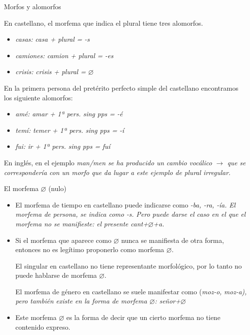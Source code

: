 \documentclass{beamer}
\begin{document}
\begin{frame}{Morfos y alomorfos}

En castellano, el morfema que indica el plural tiene tres alomorfos.
	
\begin{itemize}
	\item \it{casas}: \it{casa} + plural = \it{-s}
	\item \it{camiones}: \it{camion} + plural = \it{-es}
	\item \it{crisis}: \it{crisis} + plural = $\varnothing$
\end{itemize}

En la primera persona del pretérito perfecto simple del castellano encontramos los siguiente alomorfos: 

\begin{itemize}
	\item \it{amé}: \it{amar} + 1ª pers. sing pps = \it{-é}
	\item \it{temí}: \it{temer} + 1ª pers. sing pps = \it{-í}
	\item \it{fui}: \it{ir} + 1ª pers. sing pps = \it{fuí}
\end{itemize}

En inglés, en el ejemplo \it{man/men} se ha producido un cambio vocálico \ipa{/\ae/} $\rightarrow$  que se correspondería con un morfo que da lugar a este ejemplo de plural irregular.

\end{frame}

\begin{frame}{El morfema $\varnothing$ (nulo)}

\begin{itemize}
	\item El morfema de tiempo en castellano puede indicarse como \it{-ba, -ra, -ía}. El morfema de persona, se indica como \it{-s}. Pero puede darse el caso en el que el morfema no se manifieste: el presente \it{cant+$\varnothing$+a}.
	\item Si el morfema que aparece como $\varnothing$ nunca se manifiesta de otra forma, entonces no es legítimo proponerlo como morfema $\varnothing$. 
	
	El singular en castellano no tiene representante morfológico, por lo tanto no puede hablarse de morfema $\varnothing$. 
	
	El morfema de género en castellano se suele manifestar como (\it{moz-o, moz-a}), pero también existe en la forma de morfema $\varnothing$: \it{señor+$\varnothing$}  
	\item Este morfema $\varnothing$ es la forma de decir que un cierto morfema no tiene contenido expreso. 
\end{itemize}
	

\end{frame}
\end{document}

